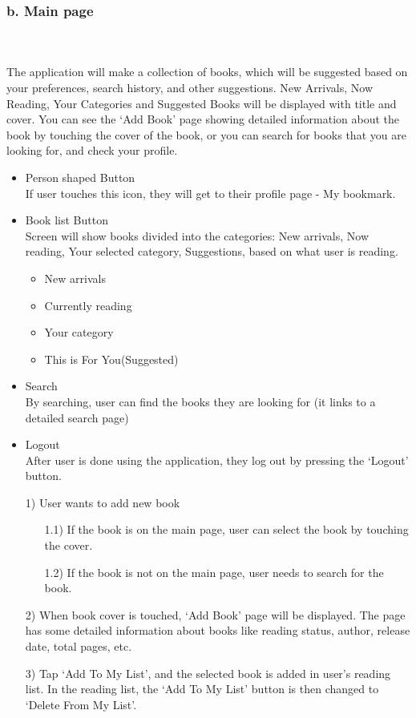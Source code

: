 \documentclass[conference]{IEEEtran}
\begin{document}
\subsubsection*{b. Main page}\hfill\\
\\
The application will make a collection of books, which will be suggested based on your preferences, search history, and other suggestions. New Arrivals, Now Reading, Your Categories and Suggested Books will be displayed with title and cover. You can see the ‘Add Book’ page showing detailed information about the book by touching the cover of the book, or you can search for books that you are looking for, and check your profile.
\begin{itemize}
    \item Person shaped Button \\
    If user touches this icon, they will get to their profile page - My bookmark.
    \item Book list Button \\
    Screen will show books divided into the categories: New arrivals, Now reading, Your selected category, Suggestions, based on what user is reading.
    \begin{itemize}
        \item New arrivals
        \item Currently reading
        \item Your category
        \item This is For You(Suggested)
    \end{itemize}
    \item Search \\
    By searching, user can find the books they are looking for (it links to a detailed search page)
    \item Logout \\
    After user is done using the application, they log out by pressing the ‘Logout’ button.
    \item[1)] User wants to add new book 
    \begin{itemize} 
        \item[1.1)] If the book is on the main page, user can select the book by touching the cover.
        \item[1.2)] If the book is not on the main page, user needs to search for the book.
    \end{itemize}
    \item[2)] When book cover is touched, ‘Add Book’ page will be displayed. The page has some detailed information about books like reading status, author, release date, total pages, etc.
    \item[3)] Tap ‘Add To My List’, and the selected book is added in user’s reading list. In the reading list, the ‘Add To My List’ button is then changed to ‘Delete From My List’.
\end{itemize}
\end{document}
